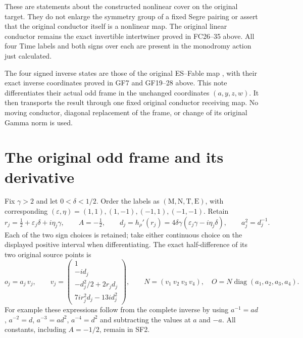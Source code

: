\documentclass[11pt]{article}
\newcommand{\diag}{\operatorname{diag}}
\begin{document}
These are statements about the constructed nonlinear cover on
the original target. They do not enlarge the symmetry group
of a fixed Segre pairing or assert that the original conductor
itself is a nonlinear map. The original linear conductor
remains the exact invertible intertwiner proved in
FC26--35 above. All four Time labels and both signs over each
are present in the monodromy action just calculated.

The four signed inverse states are those of the original ES--Fable
map \cite{ES488}, with their exact inverse coordinates proved in
GF7 and GF19--28 above. This note differentiates their actual odd frame in
the unchanged coordinates $(a,y,z,w)$. It then transports the
result through one fixed original conductor receiving map. No
moving conductor, diagonal replacement of the frame, or change
of its original Gamma norm is used.

\section{The original odd frame and its derivative}
Fix $\gamma>2$ and let $0<\delta<1/2$. Order the labels as
$(\mathrm M,\mathrm N,\mathrm T,\mathrm E)$, with corresponding
$(\varepsilon,\eta)=(1,1),(1,-1),(-1,1),(-1,-1)$. Retain
\begin{equation}
 r_j=\tfrac12+\varepsilon_j\delta+i\eta_j\gamma,
 \qquad A=-\tfrac12,\qquad
 d_j=h_\rho'(r_j)=4\delta\gamma(\varepsilon_j\gamma-i\eta_j\delta),
 \qquad a_j^2=d_j^{-1}.\tag{SF1}
\end{equation}
Each of the two sign choices is retained; take either continuous
choice on the displayed positive interval when differentiating.
The exact half-difference of its two original source points is
\begin{equation}
 o_j=a_j\,v_j,\qquad
 v_j=\begin{pmatrix}
 1\\-i d_j\\-d_j^2/2+2r_jd_j\\7ir_j^2d_j-13id_j^2
 \end{pmatrix},\qquad
 N=(v_1\ v_2\ v_3\ v_4),\quad
 O=N\diag(a_1,a_2,a_3,a_4).\tag{SF2}
\end{equation}
For example these expressions follow from the complete inverse
by using $a^{-1}=ad$, $a^{-2}=d$, $a^{-3}=ad^2$,
$a^{-4}=d^2$ and subtracting the values at $a$ and $-a$.
All constants, including $A=-1/2$, remain in SF2.
\end{document}
